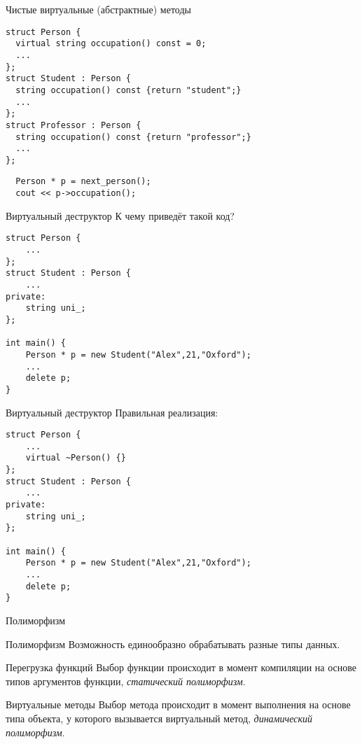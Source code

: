\documentclass{beamer}
\begin{document}
\begin{frame}[fragile]{Чистые виртуальные (абстрактные) методы}
    \begin{lstlisting}
struct Person {
  virtual string occupation() const = 0;
  ...
};
struct Student : Person {
  string occupation() const {return "student";}
  ...
};
struct Professor : Person {
  string occupation() const {return "professor";}
  ...
};
\end{lstlisting}
\begin{lstlisting}
  Person * p = next_person();
  cout << p->occupation(); 
\end{lstlisting}
\end{frame}

\begin{frame}[fragile]{Виртуальный деструктор}
К чему приведёт такой код?
    \begin{lstlisting}
struct Person {
    ...
};
struct Student : Person {
    ...
private:
    string uni_;
};

int main() {
    Person * p = new Student("Alex",21,"Oxford");
    ...
    delete p;
}
    \end{lstlisting}
\end{frame}

\begin{frame}[fragile]{Виртуальный деструктор}
Правильная реализация:
    \begin{lstlisting}
struct Person {
    ...
    virtual ~Person() {}
};
struct Student : Person {
    ...
private:
    string uni_;
};

int main() {
    Person * p = new Student("Alex",21,"Oxford");
    ...
    delete p;
}
    \end{lstlisting}
\end{frame}

\begin{frame}[fragile]{Полиморфизм}
    \begin{block}{Полиморфизм} 
        Возможность единообразно обрабатывать разные типы данных.
    \end{block}

    \begin{block}{Перегрузка функций}
        Выбор функции происходит в момент компиляции на основе типов аргументов
        функции, {\em статический полиморфизм}.
    \end{block}
               
    \begin{block}{Виртуальные методы}
        Выбор метода происходит в момент выполнения на основе типа объекта, у
        которого вызывается виртуальный метод, {\em динамический полиморфизм}. 
    \end{block}
\end{frame}
\end{document}
